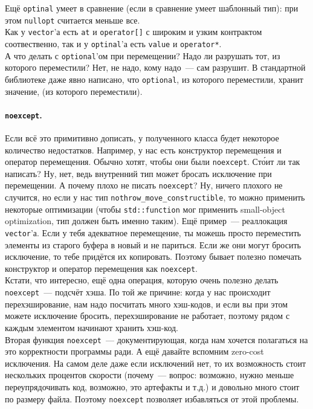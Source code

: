 \documentclass{article}
\begin{document}
    Ещё \texttt{optinal} умеет в сравнение (если в сравнение умеет шаблонный тип): при этом \texttt{nullopt} считается меньше все.\\
    Как у \texttt{vector}'а есть \texttt{at} и \texttt{operator[]} с широким и узким контрактом соотвественно, так и у \texttt{optinal}'а есть \texttt{value} и \texttt{operator*}.\\
    А что делать с \texttt{optional}'ом при перемещении? Надо ли разрушать тот, из которого переместили? Нет, не надо, кому надо~--- сам разрушит. В стандартной библиотеке даже явно написано, что \texttt{optional}, из которого переместили, хранит значение, (из которого переместили).
    \paragraph{\texttt{noexcept}.}
    Если всё это примитивно дописать, у полученного класса будет некоторое количество недостатков. Например, у нас есть конструктор перемещения и оператор перемещения. Обычно хотят, чтобы они были \texttt{noexcept}. Ст\'{о}ит ли так написать? Ну, нет, ведь внутренний тип может бросать исключение при перемещении. А почему плохо не писать \texttt{noexcept}? Ну, ничего плохого не случится, но если у нас тип \verb|nothrow_move_constructible|, то можно применить некоторые оптимизации (чтобы \texttt{std::function} мог применить small-object optimization, тип должен быть именно таким). Ещё пример~--- реаллокация \texttt{vector}'а. Если у тебя адекватное перемещение, ты можешь просто переместить элементы из старого буфера в новый и не париться. Если же они могут бросить исключение, то тебе придётся их копировать. Поэтому бывает полезно помечать конструктор и оператор перемещения как \texttt{noexcept}.\\
    Кстати, что интересно, ещё одна операция, которую очень полезно делать \texttt{noexcept}~--- подсчёт хэша. По той же причине: когда у нас происходит перехэширование, нам надо посчитать много хэш-кодов, и если вы при этом можете исключение бросить, перехэширование не работает, поэтому рядом с каждым элементом начинают хранить хэш-код.\\
    Вторая функция \texttt{noexcept}~--- документирующая, когда нам хочется полагаться на это корректности программы ради. А ещё давайте вспомним zero-cost исключения. На самом деле даже если исключений нет, то их возможность стоит нескольких процентов скорости (почему~--- вопрос: возможно, нужно меньше переупрядочивать код, возможно, это артефакты и т.д.) и довольно много стоит по размеру файла. Поэтому \texttt{noexcept} позволяет избавляться от этой проблемы.\\
\end{document}
